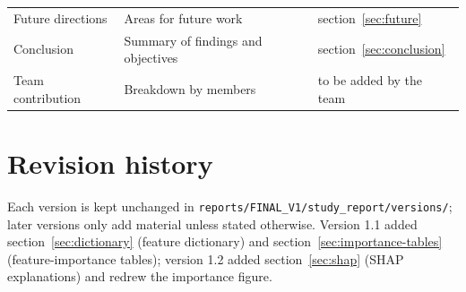 \documentclass[11pt,a4paper]{article}
\begin{document}
\begin{center}
\begin{longtable}{>{\raggedright\arraybackslash}p{3.91cm}>{\raggedright\arraybackslash}p{8.40cm}>{\raggedright\arraybackslash}p{2.93cm}}
\hspace{0pt}Future directions & \hspace{0pt}Areas for future work & \hspace{0pt}section~\ref{sec:future}\\
\hspace{0pt}Conclusion & \hspace{0pt}Summary of findings and objectives & \hspace{0pt}section~\ref{sec:conclusion}\\
\hspace{0pt}Team contribution & \hspace{0pt}Breakdown by members & \hspace{0pt}to be added by the team\\
\end{longtable}\end{center}
\section*{Revision history}
Each version is kept unchanged in \texttt{reports/FINAL\_\allowbreak{}V1/study\_\allowbreak{}report/versions/}; later versions only add material unless stated otherwise. Version 1.1 added section~\ref{sec:dictionary} (feature dictionary) and section~\ref{sec:importance-tables} (feature-importance tables); version 1.2 added section~\ref{sec:shap} (SHAP explanations) and redrew the importance figure.
\end{document}
